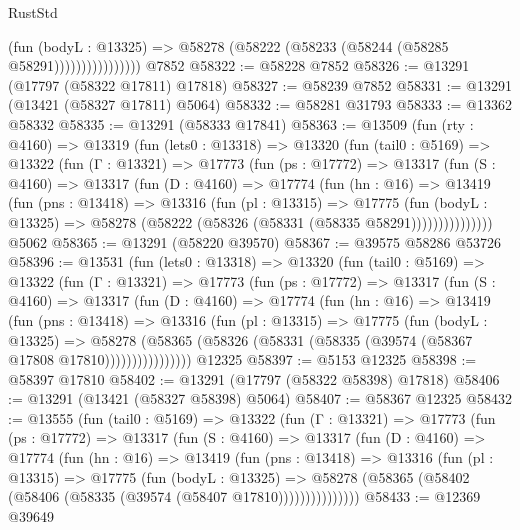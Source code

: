\begin{lexlean}{RustStd}
\begin{coremodule}
                          (fun (bodyL : @13325) =>
                          @58278 (@58222 (@58233 (@58244 (@58285 @58291))))))))))))))))
    @7852
@58322 := @58228 @7852
@58326 := @13291 (@17797 (@58322 @17811) @17818)
@58327 := @58239 @7852
@58331 := @13291 (@13421 (@58327 @17811) @5064)
@58332 := @58281 @31793
@58333 := @13362 @58332
@58335 := @13291 (@58333 @17841)
@58363 := @13509
    (fun (rty : @4160) =>
    @13319
      (fun (lets0 : @13318) =>
      @13320
        (fun (tail0 : @5169) =>
        @13322
          (fun (Γ : @13321) =>
          @17773
            (fun (ps : @17772) =>
            @13317
              (fun (S : @4160) =>
              @13317
                (fun (D : @4160) =>
                @17774
                  (fun (hn : @16) =>
                  @13419
                    (fun (pns : @13418) =>
                    @13316
                      (fun (pl : @13315) =>
                      @17775
                        (fun (bodyL : @13325) =>
                        @58278 (@58222 (@58326 (@58331 (@58335 @58291)))))))))))))))
    @5062
@58365 := @13291 (@58220 @39570)
@58367 := @39575 @58286 @53726
@58396 := @13531
    (fun (lets0 : @13318) =>
    @13320
      (fun (tail0 : @5169) =>
      @13322
        (fun (Γ : @13321) =>
        @17773
          (fun (ps : @17772) =>
          @13317
            (fun (S : @4160) =>
            @13317
              (fun (D : @4160) =>
              @17774
                (fun (hn : @16) =>
                @13419
                  (fun (pns : @13418) =>
                  @13316
                    (fun (pl : @13315) =>
                    @17775
                      (fun (bodyL : @13325) =>
                      @58278
                        (@58365
                          (@58326 (@58331 (@58335 (@39574 (@58367 @17808 @17810))))))))))))))))
    @12325
@58397 := @5153 @12325
@58398 := @58397 @17810
@58402 := @13291 (@17797 (@58322 @58398) @17818)
@58406 := @13291 (@13421 (@58327 @58398) @5064)
@58407 := @58367 @12325
@58432 := @13555
    (fun (tail0 : @5169) =>
    @13322
      (fun (Γ : @13321) =>
      @17773
        (fun (ps : @17772) =>
        @13317
          (fun (S : @4160) =>
          @13317
            (fun (D : @4160) =>
            @17774
              (fun (hn : @16) =>
              @13419
                (fun (pns : @13418) =>
                @13316
                  (fun (pl : @13315) =>
                  @17775
                    (fun (bodyL : @13325) =>
                    @58278 (@58365 (@58402 (@58406 (@58335 (@39574 (@58407 @17810)))))))))))))))
@58433 := @12369 @39649

\end{coremodule}
\end{lexlean}
